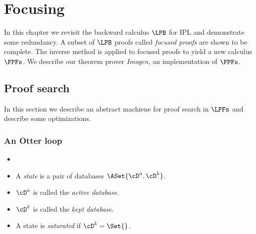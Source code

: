 
\chapter{Focusing}

In this chapter we revisit the backward calculus $\LPB$ for IPL
and demonstrate some redundancy.  A subset of $\LPB$ proofs called
\emph{focused proofs} are shown to be complete.  The inverse method
is applied to focused proofs to yield a new calculus $\FPFs$.
We describe our theorem prover \emph{Imogen}, an implementation of $\FPFs$.



\section{Proof search}

In this section we describe an abstract machiene for proof search in $\LPFs$ and describe
some optimizations.

\subsection{An Otter loop}

\begin{definition}
  \begin{itemize}
  \item[]
  \item A \emph{state} is a pair of databases $\ASet{\cD^a,\cD^k}$.
  \item $\cD^a$ is called the \emph{active database}.
  \item $\cD^k$ is called the \emph{kept database}.
  \item A state is \emph{saturated} if $\cD^k=\Set{}$.
  \end{itemize}
\end{definition}

